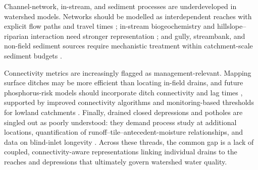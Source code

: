 Channel-network, in-stream, and sediment processes are underdeveloped in
watershed models. Networks should be modelled as interdependent reaches with
explicit flow paths and travel times \parencite{Giraud1997,Williamson2025};
in-stream biogeochemistry and hillslope--riparian interaction need stronger
representation \parencite{Schilling2012b,Basu2010}; and gully, streambank, and
non-field sediment sources require mechanistic treatment within catchment-scale
sediment budgets \parencite{Maalim2013,Dalzell2018,Walling2002}.

Connectivity metrics are increasingly flagged as management-relevant. Mapping
surface ditches may be more efficient than locating in-field drains, and future
phosphorus-risk models should incorporate ditch connectivity and lag times
\parencite{Moloney2020,Opoku2024}, supported by improved connectivity
algorithms and monitoring-based thresholds for lowland catchments
\parencite{Calsamiglia2018}. Finally, drained closed depressions and potholes
are singled out as poorly understood: they demand process study at additional
locations, quantification of runoff--tile--antecedent-moisture relationships,
and data on blind-inlet longevity
\parencite{Martin2019,Williams2020,Feyereisen2015b}. Across these threads, the
common gap is a lack of coupled, connectivity-aware representations linking
individual drains to the reaches and depressions that ultimately govern
watershed water quality.
